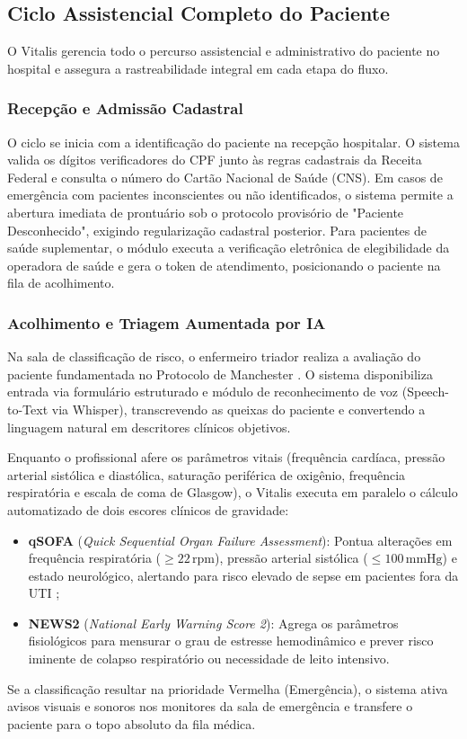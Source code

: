 \subsection{Ciclo Assistencial Completo do Paciente}
\label{subsec:ciclo_assistencial}

O Vitalis gerencia todo o percurso assistencial e administrativo do paciente no hospital e assegura a rastreabilidade integral em cada etapa do fluxo.

\subsubsection{Recepção e Admissão Cadastral}
O ciclo se inicia com a identificação do paciente na recepção hospitalar. O sistema valida os dígitos verificadores do CPF junto às regras cadastrais da Receita Federal e consulta o número do Cartão Nacional de Saúde (CNS). Em casos de emergência com pacientes inconscientes ou não identificados, o sistema permite a abertura imediata de prontuário sob o protocolo provisório de "Paciente Desconhecido", exigindo regularização cadastral posterior. Para pacientes de saúde suplementar, o módulo executa a verificação eletrônica de elegibilidade da operadora de saúde e gera o token de atendimento, posicionando o paciente na fila de acolhimento.

\subsubsection{Acolhimento e Triagem Aumentada por IA}
Na sala de classificação de risco, o enfermeiro triador realiza a avaliação do paciente fundamentada no Protocolo de Manchester \cite{manchester:2014}. O sistema disponibiliza entrada via formulário estruturado e módulo de reconhecimento de voz (Speech-to-Text via Whisper), transcrevendo as queixas do paciente e convertendo a linguagem natural em descritores clínicos objetivos.

Enquanto o profissional afere os parâmetros vitais (frequência cardíaca, pressão arterial sistólica e diastólica, saturação periférica de oxigênio, frequência respiratória e escala de coma de Glasgow), o Vitalis executa em paralelo o cálculo automatizado de dois escores clínicos de gravidade:
\begin{itemize}
    \item \textbf{qSOFA} (\textit{Quick Sequential Organ Failure Assessment}): Pontua alterações em frequência respiratória ($\ge 22\,\text{rpm}$), pressão arterial sistólica ($\le 100\,\text{mmHg}$) e estado neurológico, alertando para risco elevado de sepse em pacientes fora da UTI \cite{singer_sepsis:2016};
    \item \textbf{NEWS2} (\textit{National Early Warning Score 2}): Agrega os parâmetros fisiológicos para mensurar o grau de estresse hemodinâmico e prever risco iminente de colapso respiratório ou necessidade de leito intensivo.
\end{itemize}
Se a classificação resultar na prioridade Vermelha (Emergência), o sistema ativa avisos visuais e sonoros nos monitores da sala de emergência e transfere o paciente para o topo absoluto da fila médica.

